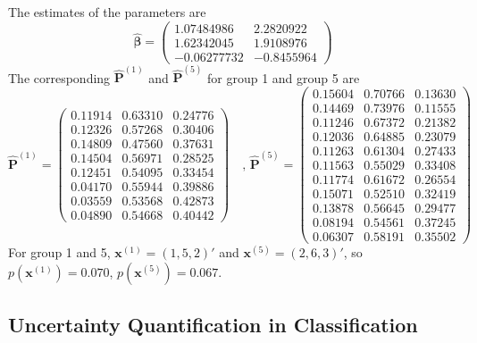 \documentclass[12pt]{article}
\newcommand{\Pmat}{\mathbf{P}}
\newcommand{\wh}{\widehat}
\begin{document}
The estimates of the parameters are
\begin{equation*}
\wh{\boldsymbol{\beta}} =
\begin{pmatrix}
 1.07484986 & 2.2820922 \\
 1.62342045 & 1.9108976 \\
 -0.06277732 &-0.8455964
\end{pmatrix}
\end{equation*}
The corresponding $\wh{\Pmat}^{(1)}$ and $\wh{\Pmat}^{(5)}$ for group 1 and group 5 are
\begin{equation*}
    \wh{\Pmat}^{(1)} = \begin{pmatrix}
 0.11914 & 0.63310 & 0.24776\\
 0.12326 & 0.57268 & 0.30406\\
 0.14809 & 0.47560 & 0.37631\\
 0.14504 & 0.56971 & 0.28525\\
 0.12451 & 0.54095 & 0.33454\\
 0.04170 & 0.55944 & 0.39886\\
 0.03559 & 0.53568 & 0.42873\\
 0.04890 & 0.54668 & 0.40442
    \end{pmatrix} \quad \text{, }
    \wh{\Pmat}^{(5)} = \begin{pmatrix}
 0.15604 & 0.70766 & 0.13630\\
 0.14469 & 0.73976 & 0.11555\\
 0.11246 & 0.67372 & 0.21382\\
 0.12036 & 0.64885 & 0.23079\\
 0.11263 & 0.61304 & 0.27433\\
 0.11563 & 0.55029 & 0.33408\\
 0.11774 & 0.61672 & 0.26554\\
 0.15071 & 0.52510 & 0.32419\\
 0.13878 & 0.56645 & 0.29477\\
 0.08194 & 0.54561 & 0.37245\\
 0.06307 & 0.58191 & 0.35502
    \end{pmatrix}
\end{equation*}
For group 1 and 5, $\boldsymbol{x}^{(1)} = (1,5,2)'$ and $\boldsymbol{x}^{(5)} = (2,6,3)'$, so $p(\boldsymbol{x}^{(1)}) = 0.070$, $p(\boldsymbol{x}^{(5)}) = 0.067$.

\subsection{Uncertainty Quantification in Classification}
\end{document}
